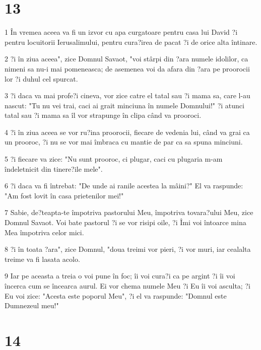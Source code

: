 \chapter{13}

\par 1 În vremea aceea va fi un izvor cu apa curgatoare pentru casa lui David ?i pentru locuitorii Ierusalimului, pentru cura?irea de pacat ?i de orice alta întinare.
\par 2 ?i în ziua aceea", zice Domnul Savaot, "voi stârpi din ?ara numele idolilor, ca nimeni sa nu-i mai pomeneasca; de asemenea voi da afara din ?ara pe proorocii lor ?i duhul cel spurcat.
\par 3 ?i daca va mai profe?i cineva, vor zice catre el tatal sau ?i mama sa, care l-au nascut: "Tu nu vei trai, caci ai grait minciuna în numele Domnului!" ?i atunci tatal sau ?i mama sa îl vor strapunge în clipa când va prooroci.
\par 4 ?i în ziua aceea se vor ru?ina proorocii, fiecare de vedenia lui, când va grai ca un prooroc, ?i nu se vor mai îmbraca cu mantie de par ca sa spuna minciuni.
\par 5 ?i fiecare va zice: "Nu sunt prooroc, ci plugar, caci cu plugaria m-am îndeletnicit din tinere?ile mele".
\par 6 ?i daca va fi întrebat: "De unde ai ranile acestea la mâini?" El va raspunde: "Am fost lovit în casa prietenilor mei!"
\par 7 Sabie, de?teapta-te împotriva pastorului Meu, împotriva tovara?ului Meu, zice Domnul Savaot. Voi bate pastorul ?i se vor risipi oile, ?i Îmi voi întoarce mina Mea împotriva celor mici.
\par 8 ?i în toata ?ara", zice Domnul, "doua treimi vor pieri, ?i vor muri, iar cealalta treime va fi lasata acolo.
\par 9 Iar pe aceasta a treia o voi pune în foc; îi voi cura?i ca pe argint ?i îi voi încerca cum se încearca aurul. Ei vor chema numele Meu ?i Eu îi voi asculta; ?i Eu voi zice: "Acesta este poporul Meu", ?i el va raspunde: "Domnul este Dumnezeul meu!"

\chapter{14}

